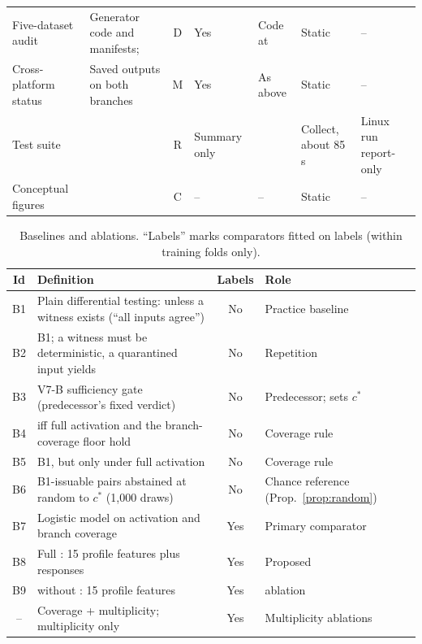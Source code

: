 \begin{table}[!t]
\begin{tabular}{|L{2.6cm}|L{4.4cm}|c|L{1.0cm}|L{1.25cm}|L{1.45cm}|L{3.3cm}|}
Five-dataset audit & Generator code and manifests;  & D & Yes & Code at  & Static & -- \\
Cross-platform status & Saved outputs on both branches & M & Yes & As above & Static & -- \\
Test suite &  & R & Summary only &  & Collect, about 85\,s & Linux run report-only \\
Conceptual figures &  & C & -- & -- & Static & -- \\
\hline
\end{tabular}
\end{table}

\begin{table}[!t]
\caption{Baselines and ablations. ``Labels'' marks comparators fitted on labels (within training folds only).}
\label{tab:baselines}
\centering
\scriptsize
\setlength{\tabcolsep}{2.5pt}
\begin{tabular}{|c|L{4.4cm}|c|L{1.6cm}|}
\hline
Id & Definition & Labels & Role \\
\hline
B1 & Plain differential testing: \NDO{} unless a witness exists (``all inputs agree'') & No & Practice baseline \\
B2 & B1; a witness must be deterministic, a quarantined input yields \INS{} & No & Repetition \\
B3 & V7-B sufficiency gate (predecessor's fixed verdict) & No & Predecessor; sets $c^\ast$ \\
B4 & \NDO{} iff full activation and the branch-coverage floor hold & No & Coverage rule \\
B5 & B1, but \NDO{} only under full activation & No & Coverage rule \\
B6 & B1-issuable pairs abstained at random to $c^\ast$ (1{,}000 draws) & No & Chance reference (Prop.~\ref{prop:random}) \\
B7 & Logistic model on activation and branch coverage & Yes & Primary comparator \\
B8 & Full \cec{}: 15 profile features plus \ers{} responses & Yes & Proposed \\
B9 & \cec{} without \ers{}: 15 profile features & Yes & \ers{} ablation \\
-- & Coverage + multiplicity; multiplicity only & Yes & Multiplicity ablations \\
\hline
\end{tabular}
\end{table}

